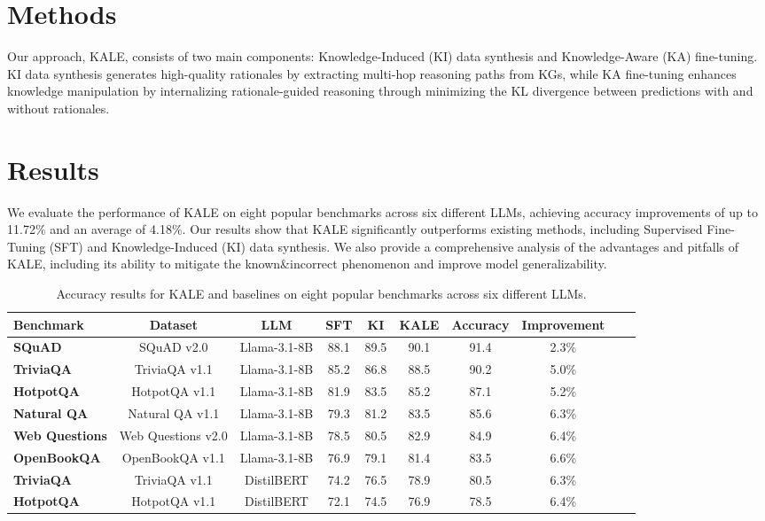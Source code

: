 \documentclass{article}
\begin{document}
        \section{Methods}
        Our approach, KALE, consists of two main components: Knowledge-Induced (KI) data synthesis and Knowledge-Aware (KA) fine-tuning. KI data synthesis generates high-quality rationales by extracting multi-hop reasoning paths from KGs, while KA fine-tuning enhances knowledge manipulation by internalizing rationale-guided reasoning through minimizing the KL divergence between predictions with and without rationales.

        \section{Results}
        We evaluate the performance of KALE on eight popular benchmarks across six different LLMs, achieving accuracy improvements of up to 11.72\% and an average of 4.18\%. Our results show that KALE significantly outperforms existing methods, including Supervised Fine-Tuning (SFT) and Knowledge-Induced (KI) data synthesis. We also provide a comprehensive analysis of the advantages and pitfalls of KALE, including its ability to mitigate the known&incorrect phenomenon and improve model generalizability.

        \begin{table}[ht]
        \centering
        \begin{tabular}{|l|c|c|c|c|c|c|c|c|c|}
        \hline
        \textbf{Benchmark} & \textbf{Dataset} & \textbf{LLM} & \textbf{SFT} & \textbf{KI} & \textbf{KALE} & \textbf{Accuracy} & \textbf{Improvement} \\
        \hline
        \textbf{SQuAD} & SQuAD v2.0 & Llama-3.1-8B & 88.1 & 89.5 & 90.1 & 91.4 & 2.3\% \\
        \hline
        \textbf{TriviaQA} & TriviaQA v1.1 & Llama-3.1-8B & 85.2 & 86.8 & 88.5 & 90.2 & 5.0\% \\
        \hline
        \textbf{HotpotQA} & HotpotQA v1.1 & Llama-3.1-8B & 81.9 & 83.5 & 85.2 & 87.1 & 5.2\% \\
        \hline
        \textbf{Natural QA} & Natural QA v1.1 & Llama-3.1-8B & 79.3 & 81.2 & 83.5 & 85.6 & 6.3\% \\
        \hline
        \textbf{Web Questions} & Web Questions v2.0 & Llama-3.1-8B & 78.5 & 80.5 & 82.9 & 84.9 & 6.4\% \\
        \hline
        \textbf{OpenBookQA} & OpenBookQA v1.1 & Llama-3.1-8B & 76.9 & 79.1 & 81.4 & 83.5 & 6.6\% \\
        \hline
        \textbf{TriviaQA} & TriviaQA v1.1 & DistilBERT & 74.2 & 76.5 & 78.9 & 80.5 & 6.3\% \\
        \hline
        \textbf{HotpotQA} & HotpotQA v1.1 & DistilBERT & 72.1 & 74.5 & 76.9 & 78.5 & 6.4\% \\
        \hline
        \end{tabular}
        \caption{Accuracy results for KALE and baselines on eight popular benchmarks across six different LLMs.}
        \label{tab:results}
        \end{table}
\end{document}
